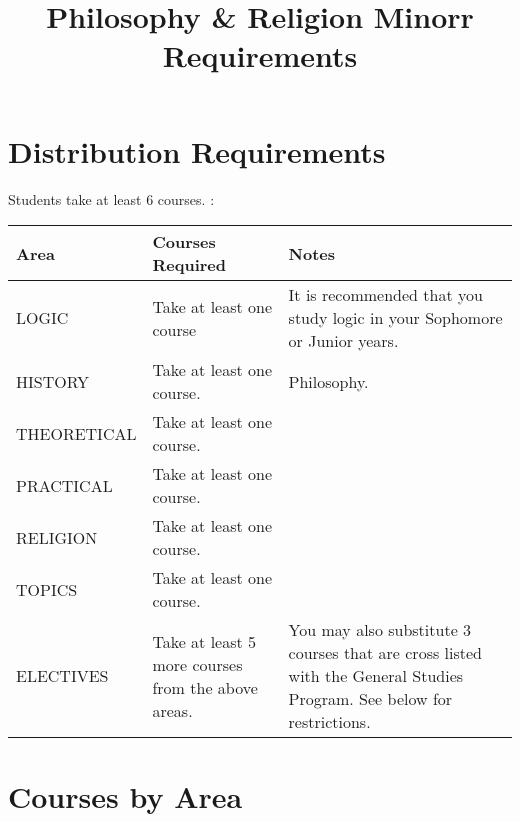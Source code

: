 \documentclass[oneside, 11pt]{article}
\renewcommand{\rmdefault}{ppl}
\renewcommand{\rmdefault}{ppl}
\begin{document}
\renewcommand*\rmdefault{ppl}\normalfont\upshape

\title{Philosophy \& Religion Minorr Requirements}
\maketitle
\section*{Distribution Requirements}

Students take at least 6 courses. : 
\begin{center}
    \begin{tabular}{ | l | p{5cm}| p{5cm} |}
    \hline
     Area & Courses Required & Notes \\ \hline
LOGIC & Take at least one course & It is recommended that you study logic in your Sophomore or Junior years. \\ \hline
HISTORY & Take at least one course. &  Philosophy.  \\ \hline
THEORETICAL & Take at least one course. &  \\ \hline
PRACTICAL & Take at least one course. & \\ \hline
RELIGION & Take at least one course. & \\ \hline
TOPICS &  Take at least one course. & \\ \hline
ELECTIVES & Take at least 5 more courses from the above areas. & You may also substitute 3 courses that are cross listed with the General Studies Program. See below for restrictions. \\ \hline
\end{tabular}
\end{center}


\section*{Courses by Area}
\end{document}

